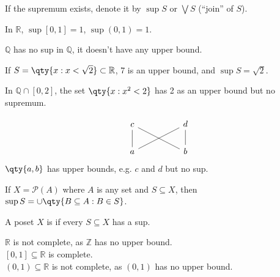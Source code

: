 \begin{notation}
    If the supremum exists, denote it by $\sup S$ or $\bigvee S$ (``join'' of $S$).
\end{notation}

\begin{example}
    In $\mathbb{R}$, $\sup [0, 1] = 1$, $\sup (0, 1) = 1$.
\end{example}

\begin{example}
    $\mathbb{Q}$ has no sup in $\mathbb{Q}$, it doesn't have any upper bound.
\end{example}

\begin{example}
    If $S = \qty{x : x < \sqrt{2}} \subset \mathbb R$, 7 is an upper bound, and $\sup S = \sqrt{2}$.

    In $\mathbb Q \cap [0, 2]$, the set $\qty{x : x^2 < 2}$ has 2 as an upper bound but no supremum.
\end{example}

\begin{example}
    \[\begin{tikzcd}
        c && d \\
        a && b
        \arrow[no head, from=2-1, to=1-1]
        \arrow[no head, from=2-3, to=1-3]
        \arrow[no head, from=2-1, to=1-3]
        \arrow[no head, from=2-3, to=1-1]
    \end{tikzcd}\]
    $\qty{a, b}$ has upper bounds, e.g. $c$ and $d$ but no sup.
\end{example}

\begin{example}
    If $X = \mathcal{P}(A)$ where $A$ is any set and $S \subseteq X$, then $\sup S = \cup \qty{B \subseteq A : B \in S}$.
\end{example}

\begin{definition}[Complete]
    A poset $X$ is  if every $S \subseteq X$ has a sup.
\end{definition}

\begin{example}
    $\mathbb R$ is not complete, as $\mathbb Z$ has no upper bound. \\
    $[0,1] \subseteq \mathbb R$ is complete. \\
    $(0,1) \subseteq \mathbb R$ is not complete, as $(0,1)$ has no upper bound.
\end{example}

